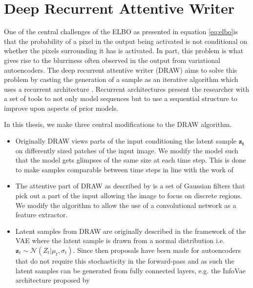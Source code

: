 \section{Deep Recurrent Attentive Writer}\label{sec:draw}

One of the central challenges of the ELBO as presented in equation \ref{eq:elbo}is that the probability of a pixel in the output being activated is not conditional on whether the pixels surrounding it has is activated. In part, this problem is what gives rise to the blurriness often observed in the output from variational autoencoders. The deep recurrent attentive writer (DRAW) aims to solve this problem by casting the generation of a sample as an iterative algorithm which uses a recurrent architecture \cite{Gregor2015}. Recurrent architectures present the researcher with a set of tools to not only model sequences but to use a sequential structure to improve upon aspects of prior models.

In this thesis, we make three central modifications to the DRAW algorithm. 

\begin{itemize}
\item Originally DRAW views parts of the input conditioning the latent sample $\mathbf{z_t}$ on differently sized patches of the input image. We modify the model such that the model gets glimpses of the same size at each time step. This is done to make samples comparable between time steps in line with the work of \citet{Harris2019}
\item The attentive part of DRAW as described by \citet{Gregor2015} is a set of Gaussian filters that pick out a part of the input allowing the image to focus on discrete regions. We modify the algorithm to allow the use of a convolutional network as a feature extractor.
\item Latent samples from DRAW are originally described in the framework of the VAE where the latent sample is drawn from a normal distribution i.e. $\mathbf{z}_t \sim \mathcal{N}(Z_t|\mu_t, \sigma_t)$. Since then proposals have been made for autoencoders that do not require this stochasticity in the forward-pass and as such the latent samples can be generated from fully connected layers, e.g. the InfoVae architecture proposed by \citet{Zhao}
\end{itemize}

